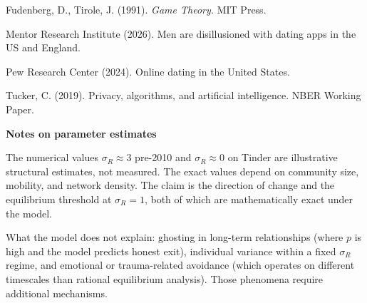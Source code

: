 \documentclass[12pt]{article}
\begin{document}
\medskip
\noindent[2] Fudenberg, D., Tirole, J. (1991). \textit{Game Theory.} MIT Press.

\medskip
\noindent[3] Mentor Research Institute (2026). Men are disillusioned with dating apps in the US and England.

\medskip
\noindent[4] Pew Research Center (2024). Online dating in the United States.

\medskip
\noindent[5] Tucker, C. (2019). Privacy, algorithms, and artificial intelligence. NBER Working Paper.

\vspace{0.6cm}

\noindent\textbf{Notes on parameter estimates}

\medskip
\noindent The numerical values $\sigma_R \approx 3$ pre-2010 and $\sigma_R \approx 0$ on Tinder are illustrative structural estimates, not measured. The exact values depend on community size, mobility, and network density. The claim is the direction of change and the equilibrium threshold at $\sigma_R = 1$, both of which are mathematically exact under the model.

\medskip
\noindent What the model does not explain: ghosting in long-term relationships (where $p$ is high and the model predicts honest exit), individual variance within a fixed $\sigma_R$ regime, and emotional or trauma-related avoidance (which operates on different timescales than rational equilibrium analysis). Those phenomena require additional mechanisms.
\end{document}
